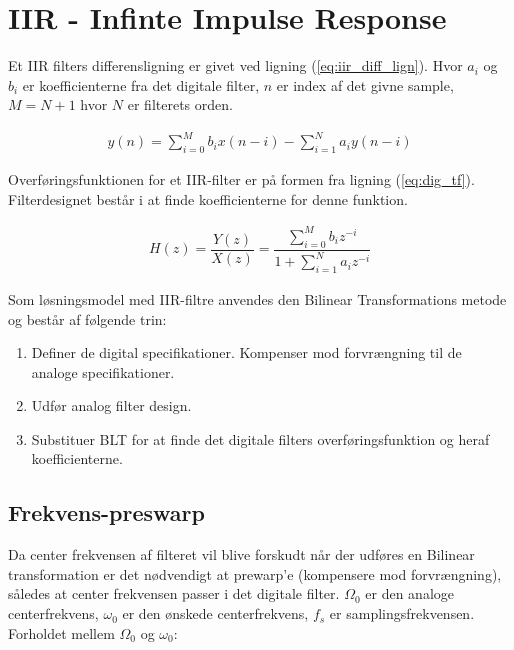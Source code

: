 \section{IIR - Infinte Impulse Response}\label{sec:iir} 

Et IIR filters differensligning er givet ved ligning (\ref{eq:iir_diff_lign}).
Hvor $a_i$ og $b_i$ er koefficienterne fra det digitale filter, $n$ er index af det givne sample,
$M =N + 1$ hvor $N$ er filterets orden.

\begin{align}
y(n) = \sum\limits_{i=0}^{M} b_i x(n-i) - \sum\limits_{i=1}^{N} a_i y(n-i) 
\label{eq:iir_diff_lign}
\end{align}

    Overføringsfunktionen for et IIR-filter er på formen fra ligning (\ref{eq:dig_tf}). Filterdesignet består  
    i at finde koefficienterne for denne funktion.
    
    \begin{align}
        H(z) = \dfrac{Y(z)}{X(z)} = \dfrac{\sum\limits_{i=0}^M b_i z^{-i}}{1 + \sum\limits_{i=1}^N a_i z^{-i}}
        \label{eq:dig_tf}
    \end{align}

Som løsningsmodel med IIR-filtre anvendes den Bilinear Transformations metode og består af følgende trin:
    \begin{enumerate}
        \item Definer de digital specifikationer. Kompenser mod forvrængning til de analoge specifikationer.
        \item Udfør analog filter design.
        \item Substituer BLT for at finde det digitale filters overføringsfunktion og heraf koefficienterne. 
    \end{enumerate}



    \subsection{Frekvens-preswarp}
    Da center frekvensen af filteret vil blive forskudt når der udføres en Bilinear
    transformation er det nødvendigt at prewarp'e (kompensere mod forvrængning), således at center frekvensen passer i det digitale filter.  
    $\Omega_0$ er den analoge centerfrekvens, $\omega_0$ er den ønskede centerfrekvens, $f_s$ er samplingsfrekvensen. 
    Forholdet mellem $\Omega_0$ og $\omega_0$:
  

